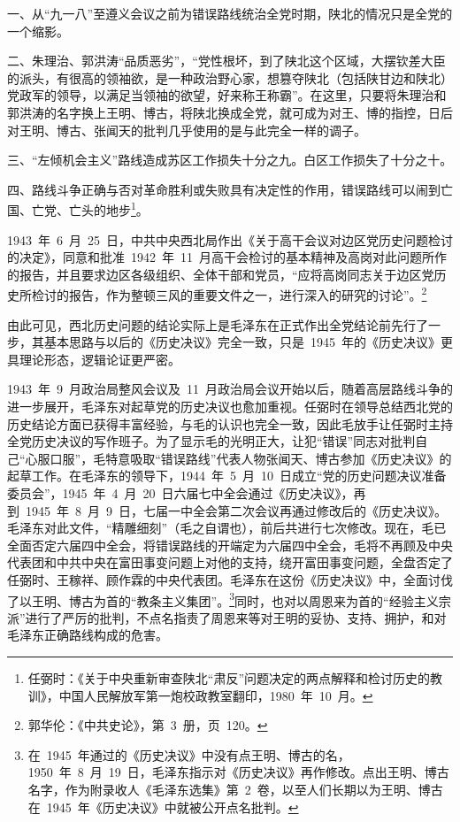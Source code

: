 一、从“九一八”至遵义会议之前为错误路线统治全党时期，陕北的情况只是全党的一个缩影。

二、朱理治、郭洪涛“品质恶劣”，“党性根坏，到了陕北这个区域，大摆钦差大臣的派头，有很高的领袖欲，是一种政治野心家，想篡夺陕北（包括陕甘边和陕北）党政军的领导，以满足当领袖的欲望，好来称王称霸”。在这里，只要将朱理治和郭洪涛的名字换上王明、博古，将陕北换成全党，就可成为对王、博的指控，日后对王明、博古、张闻天的批判几乎使用的是与此完全一样的调子。

三、“左倾机会主义”路线造成苏区工作损失十分之九。白区工作损失了十分之十。

四、路线斗争正确与否对革命胜利或失败具有决定性的作用，错误路线可以闹到亡国、亡党、亡头的地步\footnote{任弼时：《关于中央重新审查陕北“肃反”问题决定的两点解释和检讨历史的教训》，中国人民解放军第一炮校政教室翻印，1980~年~10~月。}。

1943~年~6~月~25~日，中共中央西北局作出《关于高干会议对边区党历史问题检讨的决定》，同意和批准~1942~年~11~月高干会检讨的基本精神及高岗对此问题所作的报告，并且要求边区各级组织、全体干部和党员，“应将高岗同志关于边区党历史所检讨的报告，作为整顿三风的重要文件之一，进行深入的研究的讨论”。\footnote{郭华伦：《中共史论》，第~3~册，页~120。}

由此可见，西北历史问题的结论实际上是毛泽东在正式作出全党结论前先行了一步，其基本思路与以后的《历史决议》完全一致，只是~1945~年的《历史决议》更具理论形态，逻辑论证更严密。

1943~年~9~月政治局整风会议及~11~月政治局会议开始以后，随着高层路线斗争的进一步展开，毛泽东对起草党的历史决议也愈加重视。任弼时在领导总结西北党的历史结论方面已获得丰富经验，与毛的认识也完全一致，因此毛放手让任弼时主持全党历史决议的写作班子。为了显示毛的光明正大，让犯“错误”同志对批判自己“心服口服”，毛特意吸取“错误路线”代表人物张闻天、博古参加《历史决议》的起草工作。在毛泽东的领导下，1944~年~5~月~10~日成立“党的历史问题决议准备委员会”，1945~年~4~月~20~日六届七中全会通过《历史决议》，再到~1945~年~8~月~9~日，七届一中全会第二次会议再通过修改后的《历史决议》。毛泽东对此文件，“精雕细刻”（毛之自谓也），前后共进行七次修改。现在，毛已全面否定六届四中全会，将错误路线的开端定为六届四中全会，毛将不再顾及中央代表团和中共中央在富田事变问题上对他的支持，绕开富田事变问题，全盘否定了任弼时、王稼祥、顾作霖的中央代表团。毛泽东在这份《历史决议》中，全面讨伐了以王明、博古为首的“教条主义集团”。\footnote{在~1945~年通过的《历史决议》中没有点王明、博古的名，1950~年~8~月~19~日，毛泽东指示对《历史决议》再作修改。点出王明、博古名字，作为附录收人《毛泽东选集》第~2~卷，以至人们长期以为王明、博古在~1945~年《历史决议》中就被公开点名批判。}同时，也对以周恩来为首的“经验主义宗派”进行了严厉的批判，不点名指责了周恩来等对王明的妥协、支持、拥护，和对毛泽东正确路线构成的危害。


